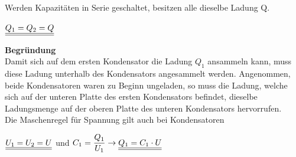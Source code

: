 										\newpage
											\beginip
												Werden Kapazitäten in Serie geschaltet, besitzen alle dieselbe Ladung Q.
												\begin{center}
													\fix
														 $\displaystyle \underline{\underline{Q_1 = Q_2 = Q}}$
												\end{center}
											\iend

											\textbf{Begründung} \\
												Damit sich auf dem ersten Kondensator die Ladung $Q_1$ ansammeln kann, muss diese Ladung unterhalb des Kondensators angesammelt werden. Angenommen, beide Kondensatoren waren zu Beginn ungeladen,
												so muss die Ladung, welche sich auf der unteren Platte des ersten Kondensators befindet, dieselbe Ladungsmenge auf der oberen Platte des unteren Kondensators hervorrufen. \\

												\beginip
													Die Maschenregel für Spannung gilt auch bei Kondensatoren
													\begin{center}
														\fix
															$\displaystyle \underline{\underline{U_1 = U_2 = U}} $  und  $\displaystyle C_1 = \frac{Q_1}{U_1} \rightarrow \underline{\underline{Q_1 = C_1 \cdot U}}$
													\end{center}
												\iend


